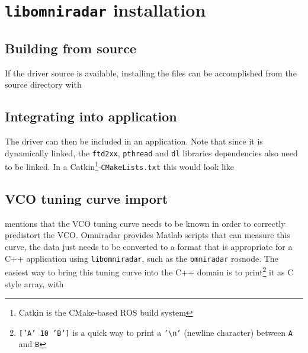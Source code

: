 \chapter{\texttt{libomniradar} installation} \label{install}

\section{Building from source}
If the driver source is available, installing the files can be
accomplished from the source directory with

\begin{Shaded}
\begin{Highlighting}[]
\KeywordTok{\&\&} 
\end{Highlighting}
\end{Shaded}


\section{Integrating into application}
The driver can then be included in an application. Note that since it is
dynamically linked, the \texttt{ftd2xx}, \texttt{pthread} and
\texttt{dl} libraries dependencies also need to be linked. In a Catkin\footnote{Catkin is the CMake-based ROS build system}-\texttt{CMakeLists.txt}
this would look like

\begin{Shaded}
\begin{Highlighting}[]
\NormalTok{(}
\NormalTok{)}
\end{Highlighting}
\end{Shaded}

\section{VCO tuning curve import} \label{vcotune}

 mentions that the VCO tuning curve needs to be known in order to correctly predistort the VCO.
Omniradar provides Matlab scripts that can measure this curve, the data just needs to be converted to a format that is appropriate for a C++ application using \texttt{libomniradar}, such as the \texttt{omniradar} rosnode.
The easiest way to bring this tuning curve into the C++ domain is to
print\footnote{\texttt{['A' 10 'B']} is a quick way to print a \texttt{'{\textbackslash}n'} (newline character) between \texttt{A} and \texttt{B}}
it as C style array, with

